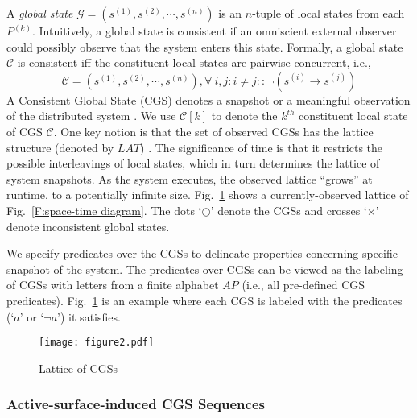 \documentclass[10pt,conference,compsocconf,letterpaper]{IEEEtran}
\begin{document}
A \textit{global state} $\mathcal{G} = (s^{(1)}, s^{(2)}, \cdots, s^{(n)})$ is an $n$-tuple of local states from each $P^{(k)}$.
Intuitively, a global state is consistent if an omniscient external observer could possibly observe that the system enters this state. Formally, a global state $\mathcal{C}$ is consistent iff the constituent local states are pairwise concurrent, i.e.,
\begin{displaymath}
\mathcal{C} = (s^{(1)}, s^{(2)}, \cdots, s^{(n)}), \forall\ i,j : i\neq j :: \neg (s^{(i)}\rightarrow s^{(j)})
\end{displaymath}
A Consistent Global State (CGS) denotes a snapshot or a meaningful observation of the distributed system \cite{Babaoglu93, Schwarz94}. We use $\mathcal{C}[k]$ to denote the $k^{th}$ constituent local state of CGS $\mathcal{C}$.
One key notion is that the set of observed CGSs has the lattice structure (denoted by $LAT$) \cite{Stoller00}. The significance of time is that it restricts the possible interleavings of local states, which in turn determines the lattice of system snapshots. As the system executes, the observed lattice ``grows'' at runtime, to a potentially infinite size. Fig.~\ref{F:Lattice} shows a currently-observed lattice of Fig.~\ref{F:space-time diagram}. The dots `$\bigcirc$' denote the CGSs and crosses `$\times$' denote inconsistent global states.

We specify predicates over the CGSs to delineate properties concerning specific snapshot of the system. The predicates over CGSs can be viewed as the labeling of CGSs with letters from a finite alphabet $AP$ (i.e., all pre-defined CGS predicates). Fig.~\ref{F:Lattice} is an example where each CGS is labeled with the predicates (`$a$' or `$\neg a$') it satisfies.
\begin{figure}[tbp]
\begin{center}
  \texttt{[image: figure2.pdf]}
  \caption{Lattice of CGSs}
  \label{F:Lattice}
\end{center}
\end{figure}

\subsubsection{Active-surface-induced CGS Sequences}
\end{document}
